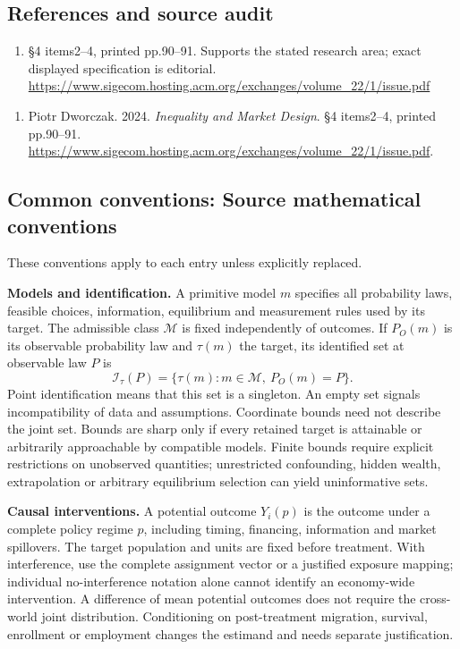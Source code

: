\documentclass[11pt,a4paper]{article}
\begin{document}
\subsection*{References and source audit}
\begin{enumerate}
\item §4 items2–4, printed pp.90–91. Supports the stated research area; exact displayed specification is editorial. \url{https://www.sigecom.hosting.acm.org/exchanges/volume_22/1/issue.pdf}
\end{enumerate}
\begin{enumerate}\raggedright
\item\hypertarget{definitions:source:30007578:1}{} Piotr Dworczak. 2024. \emph{Inequality and Market Design}. §4 items2–4, printed pp.90–91.
\url{https://www.sigecom.hosting.acm.org/exchanges/volume_22/1/issue.pdf}.
\end{enumerate}

\subsection*{Common conventions: Source mathematical conventions}

These conventions apply to each entry unless explicitly replaced.

\textbf{Models and identification.} A primitive model \(m\) specifies all probability laws, feasible choices, information, equilibrium and measurement rules used by its target. The admissible class \(\mathcal M\) is fixed independently of outcomes. If \(P_O(m)\) is its observable probability law and \(\tau(m)\) the target, its identified set at observable law \(P\) is
\[
 \mathcal I_\tau(P)=\{\tau(m):m\in\mathcal M,\ P_O(m)=P\}.
\]
Point identification means that this set is a singleton. An empty set signals incompatibility of data and assumptions. Coordinate bounds need not describe the joint set. Bounds are sharp only if every retained target is attainable or arbitrarily approachable by compatible models. Finite bounds require explicit restrictions on unobserved quantities; unrestricted confounding, hidden wealth, extrapolation or arbitrary equilibrium selection can yield uninformative sets.

\textbf{Causal interventions.} A potential outcome \(Y_i(p)\) is the outcome under a complete policy regime \(p\), including timing, financing, information and market spillovers. The target population and units are fixed before treatment. With interference, use the complete assignment vector or a justified exposure mapping; individual no-interference notation alone cannot identify an economy-wide intervention. A difference of mean potential outcomes does not require the cross-world joint distribution. Conditioning on post-treatment migration, survival, enrollment or employment changes the estimand and needs separate justification.
\end{document}
